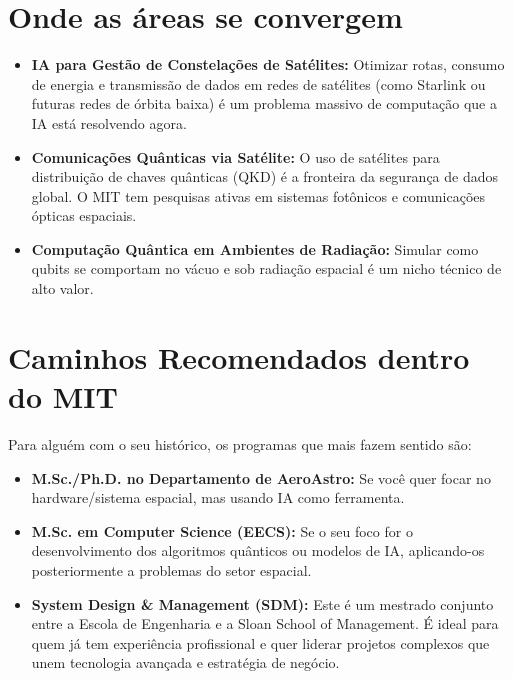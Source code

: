 \documentclass{article}
\begin{document}
\section*{Onde as áreas se convergem}
\begin{itemize}
    \item \textbf{IA para Gestão de Constelações de Satélites:} Otimizar rotas, consumo de energia e transmissão de dados em redes de satélites (como Starlink ou futuras redes de órbita baixa) é um problema massivo de computação que a IA está resolvendo agora.
    \item \textbf{Comunicações Quânticas via Satélite:} O uso de satélites para distribuição de chaves quânticas (QKD) é a fronteira da segurança de dados global. O MIT tem pesquisas ativas em sistemas fotônicos e comunicações ópticas espaciais.
    \item \textbf{Computação Quântica em Ambientes de Radiação:} Simular como qubits se comportam no vácuo e sob radiação espacial é um nicho técnico de alto valor.
\end{itemize}

\section*{Caminhos Recomendados dentro do MIT}
Para alguém com o seu histórico, os programas que mais fazem sentido são:
\begin{itemize}
    \item \textbf{M.Sc./Ph.D. no Departamento de AeroAstro:} Se você quer focar no hardware/sistema espacial, mas usando IA como ferramenta.
    \item \textbf{M.Sc. em Computer Science (EECS):} Se o seu foco for o desenvolvimento dos algoritmos quânticos ou modelos de IA, aplicando-os posteriormente a problemas do setor espacial.
    \item \textbf{System Design \& Management (SDM):} Este é um mestrado conjunto entre a Escola de Engenharia e a Sloan School of Management. É ideal para quem já tem experiência profissional e quer liderar projetos complexos que unem tecnologia avançada e estratégia de negócio.
\end{itemize}
\end{document}
